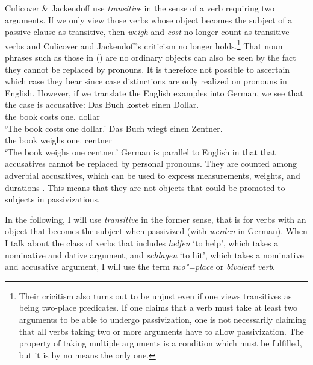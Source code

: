 \noindent
Culicover \& Jackendoff use \emph{transitive} in the sense of a verb requiring two arguments. If we only view those verbs whose object becomes the subject of
a passive clause as transitive, then \emph{weigh} and \emph{cost} no longer count as transitive verbs and Culicover and Jackendoff's criticism no longer holds.\footnote{%
Their cricitism also turns out to be unjust even if one views transitives as being two-place predicates. If one claims that a verb must take at least two arguments to be able
to undergo passivization, one is not necessarily claiming that all verbs taking two or more arguments have to allow passivization. The property of taking multiple arguments is
a condition which must be fulfilled, but it is by no means the only one.
}
That noun phrases such as those in () are no ordinary objects can also be seen by the fact they cannot be replaced by pronouns. It is therefore not possible to ascertain
which case they bear since case distinctions are only realized on pronouns in English.
However, if we translate the English examples into German, we see that the case is accusative:
\eal
\ex 
\gll Das Buch kostet einen Dollar.\\
      the book costs one.\acc{} dollar\\
\glt `The book costs one dollar.'
\ex 
\gll Das Buch wiegt einen Zentner.\\
     the book weighs one.\acc{} centner\\
\glt `The book weighs one centner.'
\zl
German is parallel to English in that that accusatives cannot be replaced by personal pronouns. They
are counted among adverbial accusatives, which can be used to express measurements, weights, and durations
\citep[\S 1246]{Duden2005}. This means that they are not objects that could be promoted to subjects
in passivizations.



In the following, I will use \emph{transitive} in the former sense, that is for verbs with an object that becomes the subject when passivized (\eg with
\emph{werden} in German). When I talk about the class of verbs that includes \emph{helfen} `to help', which takes a nominative and dative argument, and \emph{schlagen} `to hit', 
which takes a nominative and accusative argument, I will use the term \emph{two"=place} or \emph{bivalent verb}.

